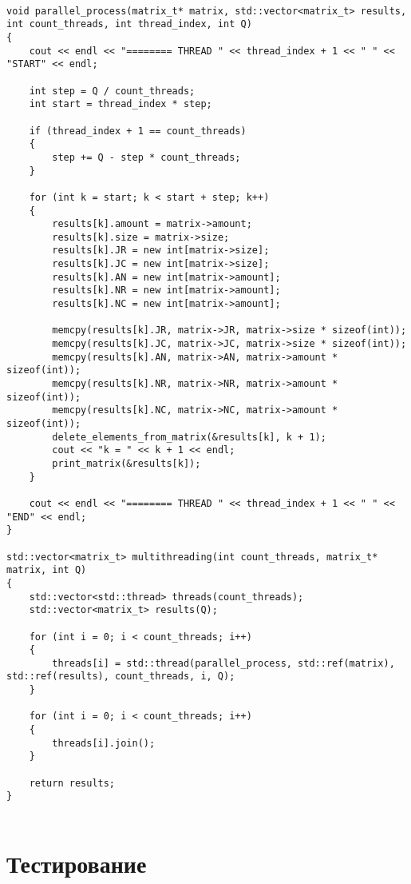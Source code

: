 \begin{center}
\captionsetup{justification=raggedright,singlelinecheck=off}
\begin{lstlisting}[label=lst:multi,caption=Многопоточная реализация алгоритма обработки упакованной разреженной матрицы]

void parallel_process(matrix_t* matrix, std::vector<matrix_t> results, int count_threads, int thread_index, int Q)
{
	cout << endl << "======== THREAD " << thread_index + 1 << " " << "START" << endl;
	
	int step = Q / count_threads;
	int start = thread_index * step;
	
	if (thread_index + 1 == count_threads)
	{
		step += Q - step * count_threads;
	}
	
	for (int k = start; k < start + step; k++)
	{
		results[k].amount = matrix->amount;
		results[k].size = matrix->size;
		results[k].JR = new int[matrix->size];
		results[k].JC = new int[matrix->size];
		results[k].AN = new int[matrix->amount];
		results[k].NR = new int[matrix->amount];
		results[k].NC = new int[matrix->amount];
		
		memcpy(results[k].JR, matrix->JR, matrix->size * sizeof(int));
		memcpy(results[k].JC, matrix->JC, matrix->size * sizeof(int));
		memcpy(results[k].AN, matrix->AN, matrix->amount * sizeof(int));
		memcpy(results[k].NR, matrix->NR, matrix->amount * sizeof(int));
		memcpy(results[k].NC, matrix->NC, matrix->amount * sizeof(int));
		delete_elements_from_matrix(&results[k], k + 1);
		cout << "k = " << k + 1 << endl;
		print_matrix(&results[k]);
	}
	
	cout << endl << "======== THREAD " << thread_index + 1 << " " << "END" << endl;
}

std::vector<matrix_t> multithreading(int count_threads, matrix_t* matrix, int Q)
{
	std::vector<std::thread> threads(count_threads);
	std::vector<matrix_t> results(Q);
	
	for (int i = 0; i < count_threads; i++)
	{
		threads[i] = std::thread(parallel_process, std::ref(matrix), std::ref(results), count_threads, i, Q);
	}
	
	for (int i = 0; i < count_threads; i++)
	{
		threads[i].join();
	}
	
	return results;
}
	    
\end{lstlisting}
\end{center}

\section{Тестирование}

